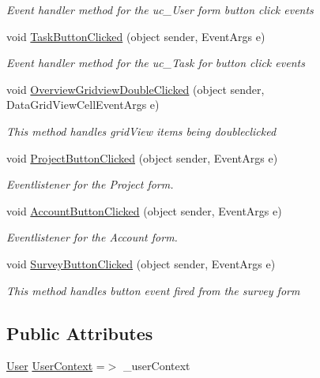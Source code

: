 \begin{DoxyCompactItemize}
\begin{DoxyCompactList}\small\item\em Event handler method for the uc\+\_\+\+User form button click events \end{DoxyCompactList}\item 
void \hyperlink{class_plex_byte_1_1_mo_cap_1_1_win_forms_1_1_u_i_manager_a0f293315c59c4051056a41c69f4444c2}{Task\+Button\+Clicked} (object sender, Event\+Args e)
\begin{DoxyCompactList}\small\item\em Event handler method for the uc\+\_\+\+Task for button click events \end{DoxyCompactList}\item 
void \hyperlink{class_plex_byte_1_1_mo_cap_1_1_win_forms_1_1_u_i_manager_aea8c5bbed5127617ba140c541f2cd28c}{Overview\+Gridview\+Double\+Clicked} (object sender, Data\+Grid\+View\+Cell\+Event\+Args e)
\begin{DoxyCompactList}\small\item\em This method handles grid\+View items being doubleclicked \end{DoxyCompactList}\item 
void \hyperlink{class_plex_byte_1_1_mo_cap_1_1_win_forms_1_1_u_i_manager_a3dfe289e68576684da3fe3753ef0cdeb}{Project\+Button\+Clicked} (object sender, Event\+Args e)
\begin{DoxyCompactList}\small\item\em Eventlistener for the Project form. \end{DoxyCompactList}\item 
void \hyperlink{class_plex_byte_1_1_mo_cap_1_1_win_forms_1_1_u_i_manager_abe3ee258a07d073d610054830f54b01e}{Account\+Button\+Clicked} (object sender, Event\+Args e)
\begin{DoxyCompactList}\small\item\em Eventlistener for the Account form. \end{DoxyCompactList}\item 
void \hyperlink{class_plex_byte_1_1_mo_cap_1_1_win_forms_1_1_u_i_manager_a3d31168c9fc0477d9fef4d7957dff319}{Survey\+Button\+Clicked} (object sender, Event\+Args e)
\begin{DoxyCompactList}\small\item\em This method handles button event fired from the survey form \end{DoxyCompactList}\end{DoxyCompactItemize}
\subsection*{Public Attributes}
\begin{DoxyCompactItemize}
\item 
\hyperlink{namespace_plex_byte_1_1_mo_cap_1_1_win_forms_a542bb6f06ab0cb20fe2382da955de892a8f9bfe9d1345237cb3b2b205864da075}{User} \hyperlink{class_plex_byte_1_1_mo_cap_1_1_win_forms_1_1_u_i_manager_a8df94d58920679d689826d4e0d63c684}{User\+Context} =$>$ \+\_\+user\+Context
\end{DoxyCompactItemize}



